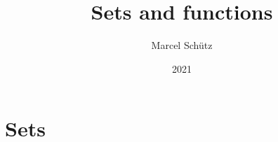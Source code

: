 \documentclass{article}
\title{Sets and functions}
\author{Marcel Schütz}
\date{2021}
\begin{document}
  \maketitle

  \tableofcontents

  \newpage
  \part{Sets}

  
  \begin{comment}
    \begin{forthel}
      \instruction{readtex basic-notions/sets-and-functions/sections/01_sets/01_sets.ftl.tex}
    \end{forthel}
  \end{comment}

  \newpage
  
  \begin{comment}
    \begin{forthel}
      \instruction{readtex basic-notions/sets-and-functions/sections/01_sets/02_powerset.ftl.tex}
    \end{forthel}
  \end{comment}

  \newpage
  
  \begin{comment}
    \begin{forthel}
      \instruction{readtex basic-notions/sets-and-functions/sections/01_sets/03_regularity.ftl.tex}
    \end{forthel}
  \end{comment}

  \newpage
  
  \begin{comment}
    \begin{forthel}
      \instruction{readtex basic-notions/sets-and-functions/sections/01_sets/04_symmetric-difference.ftl.tex}
    \end{forthel}
  \end{comment}

  \newpage
  
  \begin{comment}
    \begin{forthel}
      \instruction{readtex basic-notions/sets-and-functions/sections/01_sets/05_cartesian-product.ftl.tex}
    \end{forthel}
  \end{comment}
\end{document}
